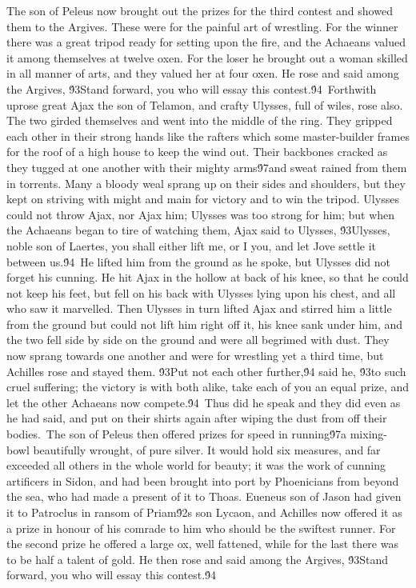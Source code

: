 {The son of Peleus now brought out the prizes for the third contest and showed them to the Argives. These were for the painful art of wrestling. For the winner there was a great tripod ready for setting upon the fire, and the Achaeans valued it among themselves at twelve oxen. For the loser he brought out a woman skilled in all manner of arts, and they valued her at four oxen. He rose and said among the Argives, \'93Stand forward, you who will essay this contest.\'94\
Forthwith uprose great Ajax the son of Telamon, and crafty Ulysses, full of wiles, rose also. The two girded themselves and went into the middle of the ring. They gripped each other in their strong hands like the rafters which some master-builder frames for the roof of a high house to keep the wind out. Their backbones cracked as they tugged at one another with their mighty arms\'97and sweat rained from them in torrents. Many a bloody weal sprang up on their sides and shoulders, but they kept on striving with might and main for victory and to win the tripod. Ulysses could not throw Ajax, nor Ajax him; Ulysses was too strong for him; but when the Achaeans began to tire of watching them, Ajax said to Ulysses, \'93Ulysses, noble son of Laertes, you shall either lift me, or I you, and let Jove settle it between us.\'94\
He lifted him from the ground as he spoke, but Ulysses did not forget his cunning. He hit Ajax in the hollow at back of his knee, so that he could not keep his feet, but fell on his back with Ulysses lying upon his chest, and all who saw it marvelled. Then Ulysses in turn lifted Ajax and stirred him a little from the ground but could not lift him right off it, his knee sank under him, and the two fell side by side on the ground and were all begrimed with dust. They now sprang towards one another and were for wrestling yet a third time, but Achilles rose and stayed them. \'93Put not each other further,\'94 said he, \'93to such cruel suffering; the victory is with both alike, take each of you an equal prize, and let the other Achaeans now compete.\'94\
Thus did he speak and they did even as he had said, and put on their shirts again after wiping the dust from off their bodies.\
The son of Peleus then offered prizes for speed in running\'97a mixing-bowl beautifully wrought, of pure silver. It would hold six measures, and far exceeded all others in the whole world for beauty; it was the work of cunning artificers in Sidon, and had been brought into port by Phoenicians from beyond the sea, who had made a present of it to Thoas. Eueneus son of Jason had given it to Patroclus in ransom of Priam\'92s son Lycaon, and Achilles now offered it as a prize in honour of his comrade to him who should be the swiftest runner. For the second prize he offered a large ox, well fattened, while for the last there was to be half a talent of gold. He then rose and said among the Argives, \'93Stand forward, you who will essay this contest.\'94\
}
